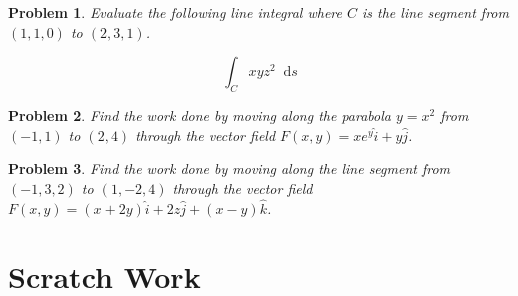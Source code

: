 \documentclass[11pt]{article}
\newtheorem{problem}{Problem}
\newcommand*\dif{\mathop{}\!\mathrm{d}}
\begin{document}
\vspace{9cm}

\begin{problem}
    Evaluate the following line integral where $C$ is the line segment from $(1,1,0)$ to $(2,3,1)$.

    \begin{equation*}
        \int_C xyz^2 \dif{s}
    \end{equation*}
\end{problem}


\vspace{9cm}

\begin{problem}
    Find the work done by moving along the parabola $y=x^2$ from $(-1,1)$ to $(2,4)$ through the vector field $F(x,y) = xe^y\hat{i} + y\hat{j}$.
\end{problem}

\vspace{9cm}

\begin{problem}
    Find the work done by moving along the line segment from $(-1,3,2)$ to $(1,-2,4)$ through the vector field $F(x,y) = (x+2y)\hat{i} +  2z\hat{j} + (x-y)\hat{k}$.
\end{problem}

\newpage

\section{Scratch Work}
\end{document}
